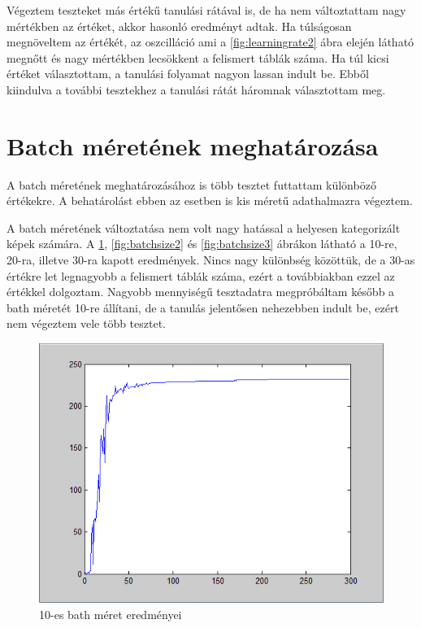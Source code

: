 Végeztem teszteket más értékű tanulási rátával is, de ha nem változtattam nagy mértékben az értéket, akkor hasonló eredményt adtak. Ha túlságosan megnöveltem az értékét, az oszcilláció ami a \ref{fig:learningrate2} ábra elején látható megnőtt és nagy mértékben lecsökkent a felismert táblák száma. Ha túl kicsi értéket választottam, a tanulási folyamat nagyon lassan indult be. Ebből kiindulva a további tesztekhez a tanulási rátát háromnak választottam meg.

\section{Batch méretének meghatározása}

A batch méretének meghatározásához is több tesztet futtattam különböző értékekre. A behatárolást ebben az esetben is kis méretű adathalmazra végeztem.

A batch méretének változtatása nem volt nagy hatással a helyesen kategorizált képek számára. A  \ref{fig:batchsize1}, \ref{fig:batchsize2} és \ref{fig:batchsize3} ábrákon látható a 10-re, 20-ra, illetve 30-ra kapott eredmények. Nincs nagy különbség közöttük, de a 30-as értékre let legnagyobb a felismert táblák száma, ezért a továbbiakban ezzel az értékkel dolgoztam. Nagyobb mennyiségű tesztadatra megpróbáltam később a bath méretét 10-re állítani, de a tanulás jelentősen nehezebben indult be, ezért nem végeztem vele több tesztet. 

\begin{figure}
\centering

\includegraphics[scale=0.5]{images/Teszt7}
\caption{10-es bath méret eredményei}

\label{fig:batchsize1}
\end{figure}

